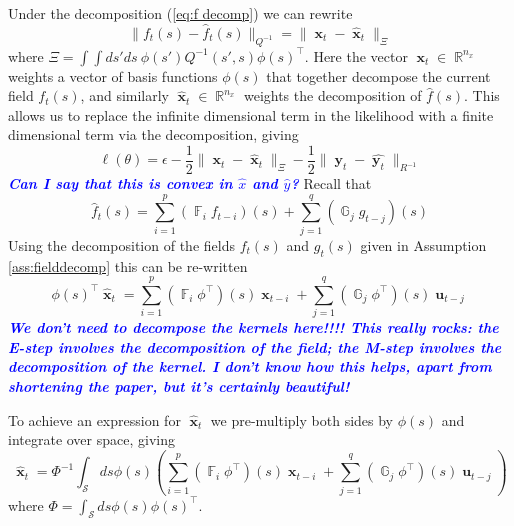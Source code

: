 \documentclass{IEEEtran}
\newcommand{\todo}[1]{\textsf{\emph{\textbf{\textcolor{blue}{#1}}}}}
\newcommand{\dist}[2]{\|#1\|_{#2}}
\DeclareMathOperator{\R}{\mathbb{R}}
\DeclareMathOperator{\F}{\mathbb{F}}
\DeclareMathOperator{\G}{\mathbb{G}}
\DeclareMathOperator{\xvec}{\mathbf{x}}
\DeclareMathOperator{\uvec}{\mathbf{u}}
\DeclareMathOperator{\yvec}{\mathbf{y}}
\begin{document}
Under the decomposition (\ref{eq:f decomp}) we can rewrite 
\begin{equation}
	\dist{f_t(s) - \hat{f}_t(s)}{Q^{-1}} = \dist{\xvec_t - \hat{\xvec}_t}{\Xi}
\end{equation}
where $\Xi = \int\int ds' ds ~ \phi(s')Q^{-1}(s',s)\phi(s)^\top$. Here the vector $\xvec_t \in \R^{n_x}$ weights a vector of basis functions $\phi(s)$ that together decompose the current field $f_t(s)$, and similarly $\hat{\xvec}_t \in \R^{n_x}$ weights the decomposition of $\hat{f}(s)$. This allows us to replace the infinite dimensional term in the likelihood with a finite dimensional term via the decomposition, giving
\begin{equation}
	\ell(\theta) =  \epsilon  - \frac{1}{2}\dist{\xvec_t - \hat{\xvec}_t}{\Xi} - \frac{1}{2}\dist{\yvec_t-\hat{\yvec_t}}{R^{-1}}
\end{equation}
\todo{Can I say that this is convex in $\hat{x}$ and $\hat{y}$?}
Recall that
\begin{equation}
	\hat{f}_t(s) = \sum_{i=1}^{p}( \F_i f_{t-i})(s) + \sum_{j=1}^{q}(\G_j g_{t-j})(s)
\end{equation}
Using the decomposition of the fields $f_t(s)$ and $g_t(s)$ given in Assumption \ref{ass:fielddecomp} this can be re-written
\begin{equation}
	\phi(s)^\top\hat{\xvec}_t = \sum_{i=1}^{p}(\F_i \phi^\top)(s)\xvec_{t-i} + \sum_{j=1}^{q}(\G_j\phi^\top)(s)\uvec_{t-j}
\end{equation}
\todo{We don't need to decompose the kernels here!!!! This really rocks: the E-step involves the decomposition of the field; the M-step involves the decomposition of the kernel. I don't know how this helps, apart from shortening the paper, but it's certainly beautiful!}

To achieve an expression for $\hat{\xvec}_t$ we pre-multiply both sides by $\phi(s)$ and integrate over space, giving
\begin{equation}
	\hat{\xvec}_t = \Phi^{-1} \int_\mathcal{S}ds \phi(s)\left(\sum_{i=1}^{p}(\F_i \phi^\top)(s)\xvec_{t-i} + \sum_{j=1}^{q}(\G_j\phi^\top)(s)\uvec_{t-j}\right)
\end{equation}
where $\Phi = \int_\mathcal{S}ds\phi(s)\phi(s)^\top$.
\end{document}
